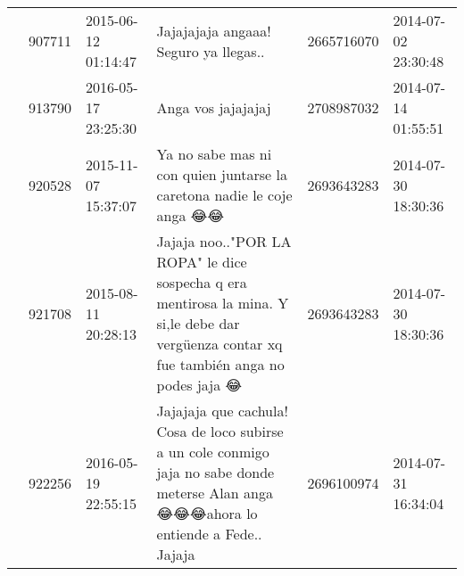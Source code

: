 \begin{tabular}{llllrl}
           & 907711  & 2015-06-12 01:14:47 &                                                                                                        Jajajajaja angaaa! Seguro ya llegas.. &  2665716070 & 2014-07-02 23:30:48 \\
           & 913790  & 2016-05-17 23:25:30 &                                                                                                                           Anga vos jajajajaj &  2708987032 & 2014-07-14 01:55:51 \\
           & 920528  & 2015-11-07 15:37:07 &                                                                       Ya no sabe mas ni con quien juntarse la caretona nadie le coje anga 😂😂 &  2693643283 & 2014-07-30 18:30:36 \\
           & 921708  & 2015-08-11 20:28:13 &    Jajaja noo.."POR LA ROPA" le dice sospecha q era mentirosa la mina. Y si,le debe dar vergüenza contar xq fue también anga no podes jaja 😂 &  2693643283 & 2014-07-30 18:30:36 \\
           & 922256  & 2016-05-19 22:55:15 &       Jajajaja que cachula! Cosa de loco subirse a un cole conmigo jaja no sabe donde meterse Alan anga 😂😂😂ahora lo entiende a Fede.. Jajaja &  2696100974 & 2014-07-31 16:34:04 \\
\bottomrule
\end{tabular}
